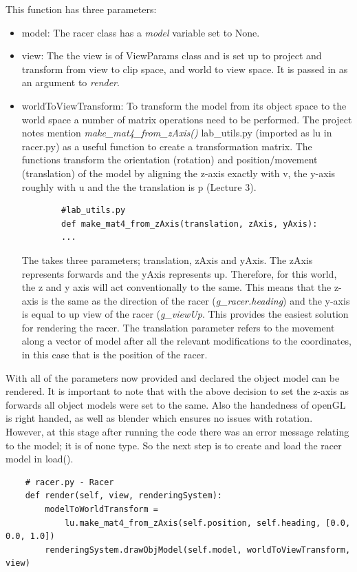 \documentclass[a4 paper, 12pt]{article}
\begin{document}
This function has three parameters:
\begin{itemize}
    \item model: The racer class has a \textit{model} variable set to None.
    \item view: The the view is of ViewParams class and is set up to project and transform from view to clip space, and world to view space. It is passed in as an argument to \textit{render}.
    \item worldToViewTransform: To transform the model from its object space to the world space a number of matrix operations need to be performed. The project notes mention \textit{make\_mat4\_from\_zAxis()} lab\_utils.py (imported as lu in racer.py) as a useful function to create a transformation matrix. The functions transform the orientation (rotation) and position/movement (translation) of the model by aligning the z-axis exactly with v, the y-axis roughly with u and the the translation is p (Lecture 3).   
    \begin{lstlisting} 
        #lab_utils.py    
        def make_mat4_from_zAxis(translation, zAxis, yAxis):
        ...    
    \end{lstlisting}    
    The takes three parameters; translation, zAxis and yAxis. The zAxis represents forwards and the yAxis represents up. Therefore, for this world, the z and y axis will act conventionally to the same. This means that the z-axis is the same as the direction of the racer (\textit{g\_racer.heading}) and the y-axis is equal to up view of the racer (\textit{g\_viewUp}. This provides the easiest solution for rendering the racer. The translation parameter refers to the movement along a vector of model after all the relevant modifications to the coordinates, in this case that is the position of the racer.    
\end{itemize}

With all of the parameters now provided and declared the object model can be rendered. It is important to note that with the above decision to set the z-axis as forwards all object models were set to the same. Also the handedness of openGL is right handed, as well as blender which ensures no issues with rotation. However, at this stage after running the code there was an error message relating to the model; it is of none type. So the next step is to create and load the racer model in load(). 
\begin{lstlisting}
    # racer.py - Racer
    def render(self, view, renderingSystem):
        modelToWorldTransform = 
            lu.make_mat4_from_zAxis(self.position, self.heading, [0.0, 0.0, 1.0])
        renderingSystem.drawObjModel(self.model, worldToViewTransform, view)
\end{lstlisting}
\end{document}
